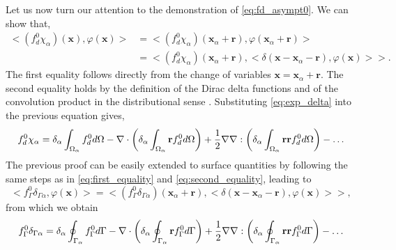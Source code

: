 Let us now turn our attention to the demonstration of \ref{eq:fd_asympt0}. 
We can show that, 
\begin{align}
    <(f_d^0\chi_\alpha)(\textbf{x}),\varphi(\textbf{x})>
    &= <(f_d^0\chi_\alpha)(\textbf{x}_\alpha+\textbf{r}),\varphi(\textbf{x}_\alpha+\textbf{r})> \label{eq:first_equality}\\
    &= 
    <(f_d^0\chi_\alpha)(\textbf{x}_\alpha + \textbf{r}) ,<\delta(\textbf{x} - \textbf{x}_\alpha - \textbf{r}), \varphi(\textbf{x})>>.
    \label{eq:second_equality}
\end{align}
The first equality follows directly from the change of variables $\textbf{x}=\textbf{x}_\alpha + \textbf{r}$. 
The second equality holds by the definition of the Dirac delta functions and of the convolution product in the distributional sense \citep{appel2007}.
Substituting \ref{eq:exp_delta}  into the previous equation gives, 
\begin{equation}
    f^0_d \chi_\alpha
    = 
    \delta_\alpha
    \int_{\Omega_{\alpha}} 
        f^0_d
     d\Omega
    - \mathbf{\nabla}\cdot\left(    
    \delta_\alpha
    \int_{\Omega_{\alpha}} 
    \textbf{r}
    f^0_d d\Omega
    \right)
    + \frac{1}{2}\mathbf{\nabla}\mathbf{\nabla} :\left(\delta_\alpha\int_{\Omega_{\alpha}} \textbf{rr} f^0_d d\Omega\right)
    - \ldots
\end{equation}
The previous proof can be easily extended to surface quantities by following the same steps as in \ref{eq:first_equality} and \ref{eq:second_equality},  leading to
\begin{equation} 
    <f_\Gamma^0 \delta_{\Gamma\alpha},\varphi(\textbf{x})> = <(f_\Gamma^0 \delta_{\Gamma\alpha})(\textbf{x}_\alpha + \textbf{r}) ,<\delta(\textbf{x} - \textbf{x}_\alpha - \textbf{r}), \varphi(\textbf{x})>>,
\end{equation}
from which we obtain
\begin{equation} 
f_\Gamma^0 \delta_{\Gamma\alpha} 
=\delta_\alpha\oint_{\Gamma_{\alpha}} f^0_\Gamma d\Gamma
- \mathbf{\nabla}\cdot\left(\delta_\alpha\oint_{\Gamma_{\alpha}} \textbf{r} f^0_\Gamma d\Gamma\right)
+ \frac{1}{2}\mathbf{\nabla}\mathbf{\nabla} :\left(\delta_\alpha\oint_{\Gamma_{\alpha}} \textbf{rr} f^0_\Gamma d\Gamma\right)
-\ldots 
\end{equation}


